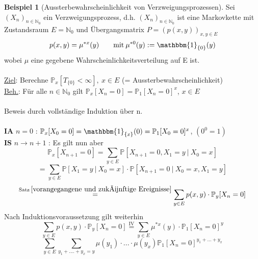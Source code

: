 \documentclass[a4paper,12pt]{scrartcl}
\theoremstyle{definition}
\newtheorem{bsp}{Beispiel}[section]
\begin{document}
\begin{bsp}[Aussterbewahrscheinlichkeit von Verzweigungsprozessen]
Sei $(X_{n})_{n \in \mathbb{N}_{0}}$ ein Verzweigungsprozess, d.h. $(X_{n})_{n \in \mathbb{N}_{0}}$ ist eine Markovkette mit Zustandsraum $E = \mathbb{N}_{0}$ und Übergangsmatrix $P = (p(x,y))_{x,y \in E}$
\begin{equation*}
p(x,y) = \mu^{*x}(y) \qquad \mathrm{mit} \: \mu^{*0}(y) := \mathbbm{1}_{\lbrace 0 \rbrace}(y)
\end{equation*}
wobei $\mu$ eine gegebene Wahrscheinlichkeitsverteilung auf E ist.
\\
\\
\underline{Ziel}: Berechne $\mathbb{P}_{x}[T_{\lbrace 0 \rbrace} < \infty ], \: x \in E$ (= Aussterbewahrscheinlichkeit)
\\
\underline{Beh.}: Für alle $n \in \mathbb{N}_{0}$ gilt $\mathbb{P}_{x}[X_{n} = 0] = \mathbb{P}_{1}[X_{n} = 0]^{x}$, $x \in E$
\\
\\
Beweis durch vollständige Induktion über n.
\\
\\
\textbf{IA} $n=0$ : $\mathbb{P}_{x}[X_{0} = 0] = \mathbbm{1}_{\lbrace x \rbrace}(0) = \mathbb{P}_{1}[X_{0} = 0]^{x}$, $(0^{0} = 1)$
\\
\textbf{IS} $n \to n+1$ : Es gilt nun aber
\begin{equation*}
\mathbb{P}_{x}[X_{n+1} = 0] = \sum_{y \in E} \mathbb{P}[X_{n+1} = 0, X_{1} = y \: | \: X_{0} = x]
\end{equation*}
\begin{equation*}
=\sum_{y \in E} \mathbb{P}[X_{1} = y \: | \: X_{0} = x] \cdot \mathbb{P}[X_{n+1} = 0 \: | \: X_{0} = x, X_{1} = y ]
\end{equation*}
\begin{equation*}
\stackrel{\mathrm{Satz} \: \ref{vorangegangene und zukünftige Ereignisse}}{=}   \sum_{y \in E} p(x,y) \cdot \mathbb{P}_{y}[X_{n} = 0]
\end{equation*}
Nach Induktionsvoraussetzung gilt weiterhin
\begin{equation*}
\sum_{y \in E} p(x,y) \cdot \mathbb{P}_{y}[X_{n} = 0] \stackrel{\mathrm{IV}}{=}  \sum_{y \in E} \mu^{*x}(y) \cdot \mathbb{P}_{1}[X_{n} = 0]^{y}
\end{equation*}
\begin{equation*}
\sum_{y \in E} \sum_{y_{1} +....+ y_{x} = y} \mu(y_{1}) \cdot ... \cdot \mu(y_{x}) \mathbb{P}_{1}[X_{n} = 0]^{y_{1}+...+y_{x}}
\end{equation*}

\end{bsp}
\end{document}
